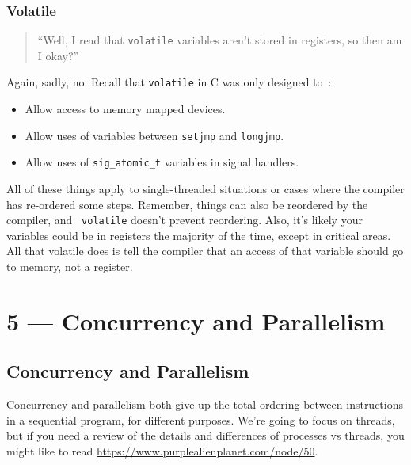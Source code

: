 \documentclass[a4paper]{report}
\begin{document}
\subsection*{Volatile}

\begin{quote}
``Well, I read that {\tt volatile} variables aren't stored in registers,
    so then am I okay?''
\end{quote}

Again, sadly, no. Recall that {\tt volatile} in C was only designed to~\cite{pr:volatile}:
      \begin{itemize}
        \item Allow access to memory mapped devices.
        \item Allow uses of variables between {\tt setjmp} and {\tt longjmp}.
        \item Allow uses of {\tt sig\_atomic\_t} variables in signal handlers.
      \end{itemize}

All of these things apply to single-threaded situations or cases where the compiler has re-ordered some steps. Remember, things can also be reordered by the compiler, and {\tt
  volatile} doesn't prevent reordering. Also, it's likely your
variables could be in registers the majority of the time, except in
critical areas. All that volatile does is tell the compiler that an access of that variable should go to memory, not a register.









\chapter*{5 --- Concurrency and Parallelism}


\section*{Concurrency and Parallelism}
Concurrency and parallelism both give up the
total ordering between instructions in a sequential program, for
different purposes. We're going to focus on threads, but if you need a review of the details and differences of processes vs threads, you might like to read   \url{https://www.purplealienplanet.com/node/50}. 
\end{document}

